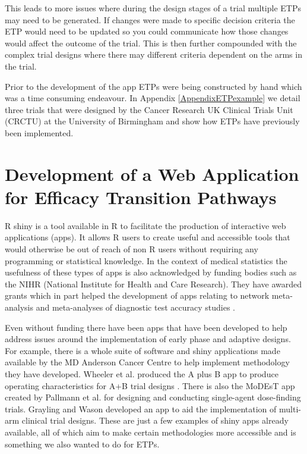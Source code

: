 This leads to more issues where during the design stages of a trial multiple ETPs may need to be generated. If changes were made to specific decision criteria the ETP would need to be updated so you could communicate how those changes would affect the outcome of the trial. This is then further compounded with the complex trial designs where there may different criteria dependent on the arms in the trial.

Prior to the development of the app ETPs were being constructed by hand which was a time consuming endeavour. In Appendix \ref{AppendixETPexample} we detail three trials that were designed by the Cancer Research UK Clinical Trials Unit (CRCTU) at the University of Birmingham and show how ETPs have previously been implemented. 


\section{Development of a Web Application for Efficacy Transition Pathways}

R shiny \cite{changShinyWebApplication}  is a tool available in R to facilitate the production of interactive web applications (apps). It allows R users to create useful and accessible tools that would otherwise be out of reach of non R users without requiring any programming or statistical knowledge. In the context of medical statistics the usefulness of these types of apps is also acknowledged by funding bodies such as the NIHR (National Institute for Health and Care Research). They have awarded grants which in part helped the development of apps relating to network meta-analysis \cite{owenMetaInsightInteractiveWebbased2019} and meta-analyses of diagnostic test accuracy studies \cite{freemanDevelopmentInteractiveWebbased2019, patelGraphicalEnhancementsSummary2021}. 

Even without funding there have been apps that have been developed to help address issues around the implementation of early phase and adaptive designs. For example, there is a whole suite of software and shiny applications made available by the MD Anderson Cancer Centre \cite{tidwellBayesianClinicalTrials2019} to help implement methodology they have developed. Wheeler et al. \cite{wheelerAplusBWebApplication2016} produced the A plus B app to produce operating characteristics for A+B trial designs \cite{linStatisticalPropertiesTraditional2001}. There is also the MoDEsT app created by Pallmann et al. \cite{pallmannDesigningEvaluatingDoseescalation2020} for designing and conducting single-agent dose-finding trials. Grayling and Wason \cite{graylingWebApplicationDesign2020} developed an app to aid the implementation of multi-arm clinical trial designs. These are just a few examples of shiny apps already available, all of which aim to make certain methodologies more accessible and is something we also wanted to do for ETPs. 


